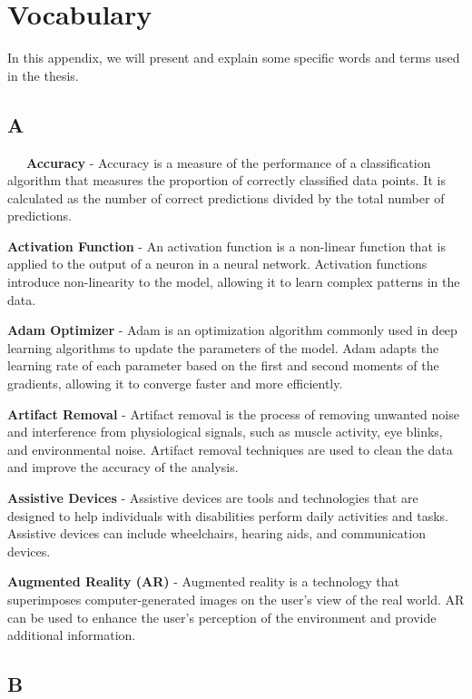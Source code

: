 \chapter{Vocabulary}\label{app:vocabulary}
In this appendix, we will present and explain some specific words and terms used in the thesis.

\section*{A}

\-\ \-\ \-\ \textbf{Accuracy} - Accuracy is a measure of the performance of a classification algorithm that measures the proportion of correctly classified data points. It is calculated as the number of correct predictions divided by the total number of predictions.

\textbf{Activation Function} - An activation function is a non-linear function that is applied to the output of a neuron in a neural network. Activation functions introduce non-linearity to the model, allowing it to learn complex patterns in the data.

\textbf{Adam Optimizer} - Adam is an optimization algorithm commonly used in deep learning algorithms to update the parameters of the model. Adam adapts the learning rate of each parameter based on the first and second moments of the gradients, allowing it to converge faster and more efficiently.

\textbf{Artifact Removal} - Artifact removal is the process of removing unwanted noise and interference from physiological signals, such as muscle activity, eye blinks, and environmental noise. Artifact removal techniques are used to clean the data and improve the accuracy of the analysis.

\textbf{Assistive Devices} - Assistive devices are tools and technologies that are designed to help individuals with disabilities perform daily activities and tasks. Assistive devices can include wheelchairs, hearing aids, and communication devices.

\textbf{Augmented Reality (AR)} - Augmented reality is a technology that superimposes computer-generated images on the user's view of the real world. AR can be used to enhance the user's perception of the environment and provide additional information.

\section*{B}

